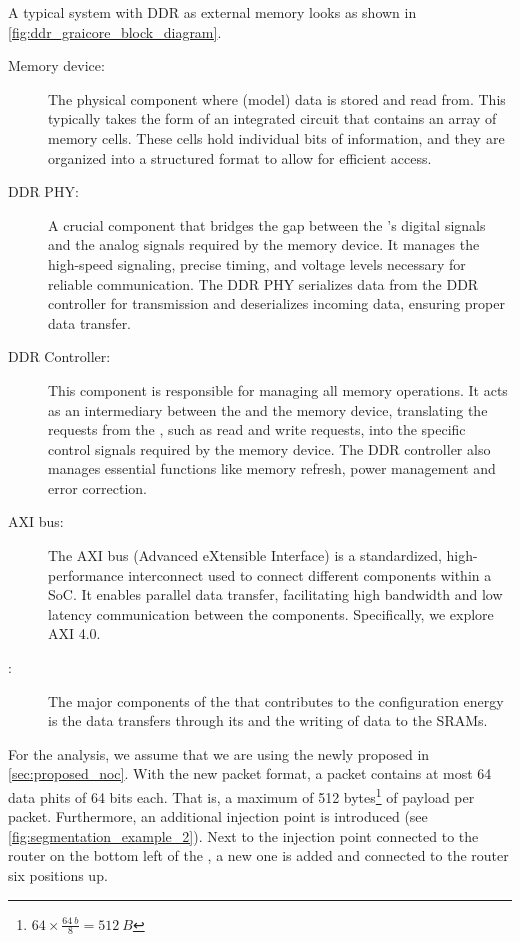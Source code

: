 A typical system with DDR as external memory looks as shown in \cref{fig:ddr_graicore_block_diagram}.
\begin{description}
    \item[Memory device:] 
    The physical component where (model) data is stored and read from.
    This typically takes the form of an integrated circuit that contains an array of memory cells.
    These cells hold individual bits of information, and they are organized into a structured format to allow for efficient access.
    \item[DDR PHY:] 
    A crucial component that bridges the gap between the \graicore{}'s digital signals and the analog signals required by the memory device.
    It manages the high-speed signaling, precise timing, and voltage levels necessary for reliable communication.
    The DDR PHY serializes data from the DDR controller for transmission and deserializes incoming data, ensuring proper data transfer.
    \item[DDR Controller:] 
    This component is responsible for managing all memory operations.
    It acts as an intermediary between the \graicore{} and the memory device, translating the requests from the \graicore{}, such as read and write requests, into the specific control signals required by the memory device.
    The DDR controller also manages essential functions like memory refresh, power management and error correction.
    \item[AXI bus:] 
    The AXI bus (Advanced eXtensible Interface) is a standardized, high-performance interconnect used to connect different components within a SoC.
    It enables parallel data transfer, facilitating high bandwidth and low latency communication between the components.
    Specifically, we explore AXI 4.0.
    \item[\graicore{}:] 
    The major components of the \graicore{} that contributes to the configuration energy is the data transfers through its \confignoc{} and the writing of data to the SRAMs.
\end{description}

For the analysis, we assume that we are using the newly proposed \confignoc{} in \cref{sec:proposed_noc}. 
With the new packet format, a packet contains at most 64 data phits of 64 bits each.
That is, a maximum of 512 bytes\footnote{$64 \times \frac{\SI{64}{b}}{8} = \SI{512}{B}$} of payload per packet.
Furthermore, an additional injection point is introduced (see \cref{fig:segmentation_example_2}).
Next to the injection point connected to the router on the bottom left of the \confignoc{}, a new one is added and connected to the router six positions up.

